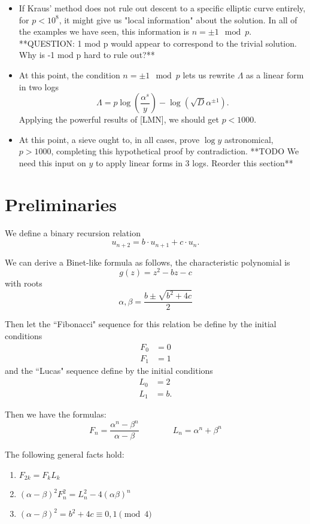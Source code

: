 \documentclass[12pt]{article}
\begin{document}
\begin{enumerate}
\begin{itemize}
\item If Kraus' method does not rule out descent to a specific elliptic curve entirely, for $p < 10^8$, it might give us "local information" about the solution. In all of the examples we have seen, this information is $n = \pm 1 \mod p$. **QUESTION: 1 mod p would appear to correspond to the trivial solution. Why is -1 mod p hard to rule out?**
\item At this point, the condition $n = \pm 1 \mod p$ lets us rewrite $\Lambda$ as a linear form in two logs 
\[ \Lambda = p \log(\frac{\alpha^s}{y}) -  \log(\sqrt{D}\alpha^{\pm 1}). \]
Applying the powerful results of [LMN], we should get $p < 1000$.

\item At this point, a sieve ought to, in all cases, prove $\log y$ astronomical, $p > 1000$, completing this hypothetical proof by contradiction. **TODO We need this input on $y$ to apply linear forms in 3 logs. Reorder this section**

\end{itemize}
\end{enumerate}


\section{Preliminaries}

We define a binary recursion relation
\[ u_{n+2} = b\cdot u_{n+1}+ c\cdot u_n. \]

We can derive a Binet-like formula as follows, the characteristic polynomial is
\[ g(z) = z^2 - bz - c\]
with roots
\[ \alpha, \beta = \frac{b \pm \sqrt{b^2+4c}}{2} \]

Then let the ``Fibonacci" sequence for this relation be define by the initial conditions
\begin{align*}
F_0 &= 0 \\
F_1 & = 1 
\end{align*}
and the ``Lucas" sequence define by the initial conditions
\begin{align*}
L_0 &= 2 \\
L_1 & = b. 
\end{align*}

Then we have the formulas:
\[F_n = \frac{\alpha^n - \beta^n}{\alpha - \beta} \qquad \qquad L_n = \alpha^n +\beta^n \]

The following general facts hold:

\begin{enumerate}

\item $F_{2k} = F_kL_k$

\item $(\alpha - \beta)^2F_n^2 = L_n^2 - 4(\alpha\beta)^n$

\item $(\alpha - \beta)^2 = b^2+4c \equiv 0,1 \pmod{4}$

\end{enumerate}
\end{document}
